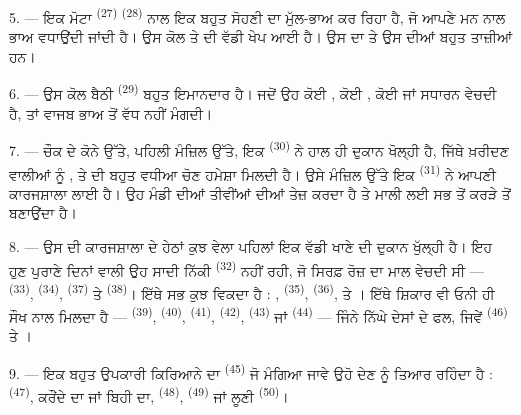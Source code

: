 5. --- ਇਕ ਮੋਟਾ  \textsuperscript{(27)} 
\textsuperscript{(28)} ਨਾਲ ਇਕ ਬਹੁਤ ਸੋਹਣੀ  ਦਾ ਮੁੱਲ-ਭਾਅ ਕਰ ਰਿਹਾ ਹੈ, ਜੋ
ਆਪਣੇ ਮਨ ਨਾਲ ਭਾਅ ਵਧਾਉਂਦੀ ਜਾਂਦੀ ਹੈ। ਉਸ ਕੋਲ  ਤੇ
 ਦੀ ਵੱਡੀ ਖੇਪ ਆਈ ਹੈ। ਉਸ ਦਾ  ਤੇ ਉਸ ਦੀਆਂ 
ਬਹੁਤ ਤਾਜ਼ੀਆਂ ਹਨ।

\VUsaut{4.0mm}
\VUsaut{3.0mm}

6. --- ਉਸ ਕੋਲ ਬੈਠੀ  \textsuperscript{(29)} ਬਹੁਤ ਇਮਾਨਦਾਰ
ਹੈ। ਜਦੋਂ ਉਹ ਕੋਈ , ਕੋਈ , ਕੋਈ  ਜਾਂ ਸਧਾਰਨ
 ਵੇਚਦੀ ਹੈ, ਤਾਂ ਵਾਜਬ ਭਾਅ ਤੋਂ ਵੱਧ ਨਹੀਂ ਮੰਗਦੀ।

7. --- ਚੌਕ ਦੇ ਕੋਨੇ ਉੱਤੇ, ਪਹਿਲੀ ਮੰਜ਼ਿਲ ਉੱਤੇ, ਇਕ 
\textsuperscript{(30)} ਨੇ ਹਾਲ ਹੀ ਦੁਕਾਨ ਖੋਲ੍ਹੀ ਹੈ, ਜਿੱਥੇ ਖ਼ਰੀਦਣ ਵਾਲੀਆਂ ਨੂੰ
,  ਤੇ  ਦੀ ਬਹੁਤ ਵਧੀਆ ਚੋਣ
ਹਮੇਸ਼ਾ ਮਿਲਦੀ ਹੈ। ਉਸੇ ਮੰਜ਼ਿਲ ਉੱਤੇ ਇਕ  \textsuperscript{(31)}
ਨੇ ਆਪਣੀ ਕਾਰਜਸ਼ਾਲਾ ਲਾਈ ਹੈ। ਉਹ ਮੰਡੀ ਦੀਆਂ ਤੀਵੀਂਆਂ ਦੀਆਂ  ਤੇਜ਼ ਕਰਦਾ ਹੈ
ਤੇ ਮਾਲੀ ਲਈ ਸਭ ਤੋਂ ਕਰੜੇ  ਤੋਂ  ਬਣਾਉਂਦਾ
ਹੈ।

\VUsaut{4.0mm}
\VUsaut{3.0mm}

8. --- ਉਸ ਦੀ ਕਾਰਜਸ਼ਾਲਾ ਦੇ ਹੇਠਾਂ ਕੁਝ ਵੇਲਾ ਪਹਿਲਾਂ ਇਕ ਵੱਡੀ ਖਾਣੇ ਦੀ ਦੁਕਾਨ ਖੁੱਲ੍ਹੀ ਹੈ।
ਇਹ ਹੁਣ ਪੁਰਾਣੇ ਦਿਨਾਂ ਵਾਲੀ ਉਹ ਸਾਦੀ ਨਿੱਕੀ 
\textsuperscript{(32)} ਨਹੀਂ ਰਹੀ, ਜੋ ਸਿਰਫ਼ ਰੋਜ਼ ਦਾ ਮਾਲ ਵੇਚਦੀ ਸੀ — 
\textsuperscript{(33)},  \textsuperscript{(34)},
 \textsuperscript{(37)} ਤੇ  \textsuperscript{(38)}।
ਇੱਥੇ ਸਭ ਕੁਝ ਵਿਕਦਾ ਹੈ : , 
\textsuperscript{(35)},  \textsuperscript{(36)},  ਤੇ । ਇੱਥੇ ਸ਼ਿਕਾਰ ਵੀ ਓਨੀ ਹੀ ਸੌਖ ਨਾਲ ਮਿਲਦਾ ਹੈ —
 \textsuperscript{(39)},  \textsuperscript{(40)},
 \textsuperscript{(41)},  \textsuperscript{(42)},
 \textsuperscript{(43)} ਜਾਂ 
\textsuperscript{(44)} — ਜਿੰਨੇ ਨਿੱਘੇ ਦੇਸਾਂ ਦੇ ਫਲ, ਜਿਵੇਂ 
\textsuperscript{(46)} ਤੇ ।

9. --- ਇਕ ਬਹੁਤ ਉਪਕਾਰੀ ਕਿਰਿਆਨੇ ਦਾ  \textsuperscript{(45)} ਜੋ ਮੰਗਿਆ
ਜਾਵੇ ਉਹੋ ਦੇਣ ਨੂੰ ਤਿਆਰ ਰਹਿੰਦਾ ਹੈ :  \textsuperscript{(47)}, ਕਰੌਂਦੇ
ਦਾ ਜਾਂ ਬਿਹੀ ਦਾ,  \textsuperscript{(48)}, 
\textsuperscript{(49)} ਜਾਂ ਲੂਣੀ  \textsuperscript{(50)}।


